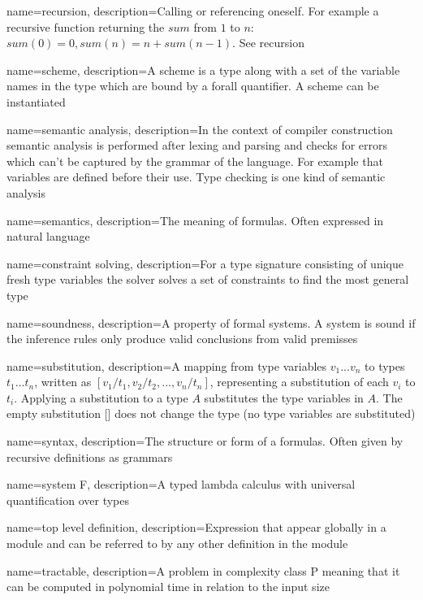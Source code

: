 { name={recursion},
  description={Calling or referencing oneself. For example a recursive function returning the $sum$ from $1$ to $n$: $sum(0) = 0, sum(n) = n + sum(n-1)$.
See recursion}
}

{ name={scheme},
  description={A scheme is a type along with a set of the variable names in the type which are bound by a forall quantifier. A scheme can be instantiated}
}

{ name={semantic analysis},
  description={In the context of compiler construction semantic analysis is performed after lexing and parsing and checks for errors which can't be captured by the grammar of the language. For example that variables are defined before their use. Type checking is one kind of semantic analysis}
}

{ name={semantics},
  description={The meaning of formulas. Often expressed in natural language}
}

{ name={constraint solving},
  description={For a type signature consisting of unique fresh type variables the solver solves a set of constraints to find the most general type}
}

{ name={soundness},
  description={A property of formal systems. A system is sound if the inference rules only produce valid conclusions from valid premisses}
} %

{ name={substitution},
  description={A mapping from type variables $v_1...v_n$ to types $t_1...t_n$, written as $[v_1/t_1,v_2/t_2,...,v_n/t_n]$, representing a substitution of each $v_i$ to $t_i$. Applying a substitution to a type $A$ substitutes the type variables in $A$. The empty substitution [] does not change the type (no type variables are substituted)}
}

{ name={syntax},
  description={The structure or form of a formulas. Often given by recursive definitions as grammars}
}

{ name={system F},
  description={A typed lambda calculus with universal quantification over types}
}

{ name={top level definition},
  description={Expression that appear globally in a module and can be referred to by any other definition in the module}
}

{ name={tractable},
  description={A problem in complexity class P meaning that it can be computed in polynomial time in relation to the input size}
}

